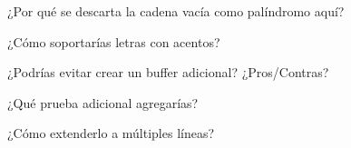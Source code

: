 
\begin{DoxyEnumerate}
\item ¿\+Por qué se descarta la cadena vacía como palíndromo aquí?
\item ¿\+Cómo soportarías letras con acentos?
\item ¿\+Podrías evitar crear un buffer adicional? ¿\+Pros/\+Contras?
\item ¿\+Qué prueba adicional agregarías?
\item ¿\+Cómo extenderlo a múltiples líneas? 
\end{DoxyEnumerate}